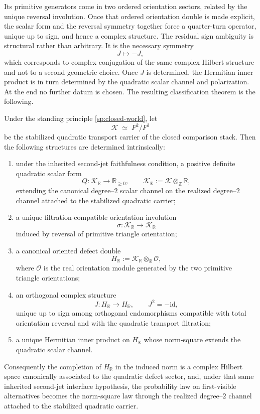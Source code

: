 Its primitive generators come in two ordered orientation sectors,
related by the unique reversal involution.
Once that ordered orientation double is made explicit, the scalar form
and the reversal symmetry together force a quarter-turn operator,
unique up to sign, and hence a complex structure.
The residual sign ambiguity is structural rather than arbitrary.
It is the necessary symmetry
\[
	J\mapsto -J,
\]
which corresponds to complex conjugation of the same complex Hilbert
structure and not to a second geometric choice.
Once \(J\) is determined, the Hermitian inner product is in turn determined by
the quadratic scalar channel and polarization.
At the end no further datum is chosen.
The resulting classification theorem is the following.
\begin{theorem}
	\label{thm:hilbert-classification}
	Under the standing principle \cref{sp:closed-world}, let
	\[
		\mathcal K \;\simeq\; F^{2}/F^{3}
	\]
	be the stabilized quadratic transport carrier of the closed comparison
	stack.
	Then the following structures are determined intrinsically:
	\begin{enumerate}[label=\textup{(\roman*)}]
		\item
		      under the inherited second-jet faithfulness condition, a positive
		      definite quadratic scalar form
		      \[
			      Q:\mathcal K_{\mathbb R}\to\mathbb R_{\ge 0},
			      \qquad
			      \mathcal K_{\mathbb R}:=\mathcal K\otimes_{\mathbb Z}\mathbb R,
		      \]
		      extending the canonical degree--\(2\) scalar channel on the
		      realized degree--\(2\) channel attached to the stabilized
		      quadratic carrier;
		\item
		      a unique filtration-compatible orientation involution
		      \[
			      \sigma:\mathcal K_{\mathbb R}\to\mathcal K_{\mathbb R}
		      \]
		      induced by reversal of primitive triangle orientation;
		\item
		      a canonical oriented defect double
		      \[
			      H_{\mathbb R}:=\mathcal K_{\mathbb R}\otimes_{\mathbb R}\mathcal O,
		      \]
		      where \(\mathcal O\) is the real orientation module generated by the
		      two primitive triangle orientations;
		\item
		      an orthogonal complex structure
		      \[
			      J:H_{\mathbb R}\to H_{\mathbb R},
			      \qquad
			      J^{2}=-\mathrm{id},
		      \]
		      unique up to sign among orthogonal endomorphisms compatible with total
		      orientation reversal and with the quadratic transport filtration;
		\item
		      a unique Hermitian inner product on \(H_{\mathbb R}\) whose
		      norm-square extends the quadratic scalar channel.
	\end{enumerate}
	Consequently the completion of \(H_{\mathbb R}\) in the induced norm is
	a complex Hilbert space canonically associated to the quadratic defect
	sector, and, under that same inherited second-jet interface
	hypothesis, the probability law on first-visible alternatives becomes
	the norm-square law through the realized degree--\(2\) channel
	attached to the stabilized quadratic carrier.
\end{theorem}
